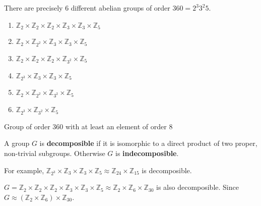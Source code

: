 \begin{remark}
	There are precisely $6$ different abelian groups of order $360 = 2^3 3^2 5$.
	\begin{enumerate}
		\item $\mathbb{Z}_2 \times \mathbb{Z}_2 \times \mathbb{Z}_2 \times \mathbb{Z}_3 \times \mathbb{Z}_3 \times \mathbb{Z}_5$ 
		\item $\mathbb{Z}_2 \times \mathbb{Z}_{2^2} \times \mathbb{Z}_3 \times \mathbb{Z}_3 \times \mathbb{Z}_5$
		\item $\mathbb{Z}_2 \times \mathbb{Z}_2 \times \mathbb{Z}_2 \times \mathbb{Z}_{3^2} \times \mathbb{Z}_5$
		\item $\mathbb{Z}_{2^3} \times \mathbb{Z}_3 \times \mathbb{Z}_3 \times \mathbb{Z}_5$
		\item $\mathbb{Z}_2 \times \mathbb{Z}_{2^2} \times \mathbb{Z}_{3^2} \times \mathbb{Z}_5$
		\item $\mathbb{Z}_{2^3} \times \mathbb{Z}_{3^2} \times \mathbb{Z}_5$
	\end{enumerate}
\end{remark}

\begin{question}
	Group of order 360 with at least an element of order 8
\end{question}

\begin{definition}
	A group $G$ is \textbf{decomposible} if it is isomorphic to a direct product of two proper, non-trivial subgroups.
	Otherwise $G$ is \textbf{indecomposible}.
\end{definition}

	For example, $\mathbb{Z}_{2^3} \times \mathbb{Z}_3 \times \mathbb{Z}_3 \times \mathbb{Z}_5 \approx \mathbb{Z}_{24} \times \mathbb{Z}_{15}$ is decomposible.

\begin{remark}
	$G = \mathbb{Z}_2 \times \mathbb{Z}_2 \times \mathbb{Z}_2 \times \mathbb{Z}_{3} \times \mathbb{Z}_3 \times \mathbb{Z}_5 \approx \mathbb{Z}_2 \times \mathbb{Z}_{6} \times \mathbb{Z}_{30}$ is also decomposible.
	Since $G \approx (\mathbb{Z}_2 \times \mathbb{Z}_{6}) \times \mathbb{Z}_{30}$.
\end{remark}

